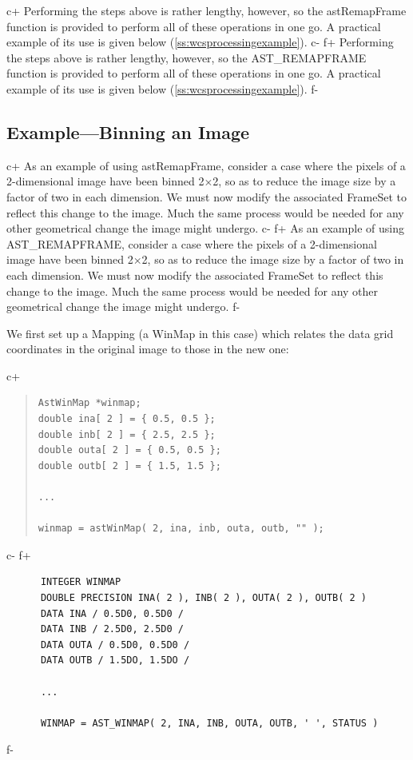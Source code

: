 \documentclass[twoside,11pt]{article}
\newcommand{\secref}[1]{\S\ref{#1}}
\renewcommand{\secref}[1]{\ref{#1}}
\begin{document}
c+
Performing the steps above is rather lengthy, however, so the
astRemapFrame function is provided to perform all of these operations
in one go. A practical example of its use is given below
(\secref{ss:wcsprocessingexample}).
c-
f+
Performing the steps above is rather lengthy, however, so the
AST\_REMAPFRAME function is provided to perform all of these
operations in one go.  A practical example of its use is given below
(\secref{ss:wcsprocessingexample}).
f-

\subsection{\label{ss:wcsprocessingexample}Example---Binning an Image}

c+
As an example of using astRemapFrame, consider a case where the pixels
of a 2-dimensional image have been binned 2$\times$2, so as to reduce
the image size by a factor of two in each dimension.  We must now
modify the associated FrameSet to reflect this change to the
image. Much the same process would be needed for any other geometrical
change the image might undergo.
c-
f+
As an example of using AST\_REMAPFRAME, consider a case where the
pixels of a 2-dimensional image have been binned 2$\times$2, so as to
reduce the image size by a factor of two in each dimension.  We must
now modify the associated FrameSet to reflect this change to the
image. Much the same process would be needed for any other geometrical
change the image might undergo.
f-

We first set up a Mapping (a WinMap in this case) which relates the
data grid coordinates in the original image to those in the new one:

c+
\begin{quote}
\small
\begin{verbatim}
AstWinMap *winmap;
double ina[ 2 ] = { 0.5, 0.5 };
double inb[ 2 ] = { 2.5, 2.5 };
double outa[ 2 ] = { 0.5, 0.5 };
double outb[ 2 ] = { 1.5, 1.5 };

...

winmap = astWinMap( 2, ina, inb, outa, outb, "" );
\end{verbatim}
\normalsize
\end{quote}
c-
f+
\small
\begin{verbatim}
      INTEGER WINMAP
      DOUBLE PRECISION INA( 2 ), INB( 2 ), OUTA( 2 ), OUTB( 2 )
      DATA INA / 0.5D0, 0.5D0 /
      DATA INB / 2.5D0, 2.5D0 /
      DATA OUTA / 0.5D0, 0.5D0 /
      DATA OUTB / 1.5DO, 1.5DO /

      ...

      WINMAP = AST_WINMAP( 2, INA, INB, OUTA, OUTB, ' ', STATUS )
\end{verbatim}
\normalsize
f-
\end{document}
